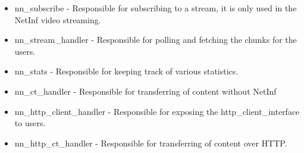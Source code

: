 \begin{description}
\begin{itemize}
\item nn\_subscribe - Responsible for subscribing to a stream, it is only used in the NetInf video streaming.
\item nn\_stream\_handler - Responsible for polling and fetching the chunks for the users.
\item nn\_stats - Responsible for keeping track of various statistics.
\item nn\_ct\_handler - Responsible for transferring of content without NetInf
\item nn\_http\_client\_handler - Responsible for exposing the http\_client\_interface to users.
\item nn\_http\_ct\_handler - Responsible for transferring of content over HTTP.
\end{itemize}


\end{description}
